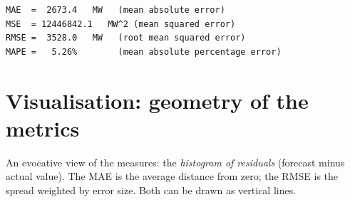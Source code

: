 \documentclass[
  english,
  letterpaper,
]{scrbook}
\begin{document}
\begin{verbatim}
MAE  =  2673.4   MW   (mean absolute error)
MSE  = 12446842.1   MW^2 (mean squared error)
RMSE =  3528.0   MW   (root mean squared error)
MAPE =   5.26%        (mean absolute percentage error)
\end{verbatim}

\section{Visualisation: geometry of the
metrics}\label{visualisation-geometry-of-the-metrics}

An evocative view of the measures: the \emph{histogram of residuals}
(forecast minus actual value). The MAE is the average distance from
zero; the RMSE is the spread weighted by error size. Both can be drawn
as vertical lines.
\end{document}
